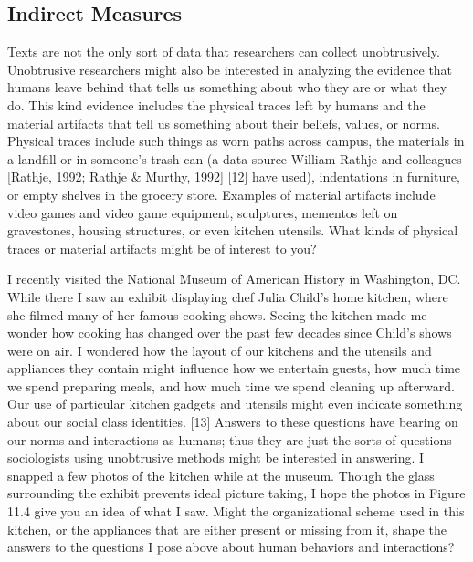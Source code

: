\subsection{Indirect Measures}

Texts are not the only sort of data that researchers can collect unobtrusively. Unobtrusive researchers might also be interested in analyzing the evidence that humans leave behind that tells us something about who they are or what they do. This kind evidence includes the physical traces left by humans and the material artifacts that tell us something about their beliefs, values, or norms. Physical traces include such things as worn paths across campus, the materials in a landfill or in someone’s trash can (a data source William Rathje and colleagues [Rathje, 1992; Rathje \& Murthy, 1992] [12] have used), indentations in furniture, or empty shelves in the grocery store. Examples of material artifacts include video games and video game equipment, sculptures, mementos left on gravestones, housing structures, or even kitchen utensils. What kinds of physical traces or material artifacts might be of interest to you?

I recently visited the National Museum of American History in Washington, DC. While there I saw an exhibit displaying chef Julia Child’s home kitchen, where she filmed many of her famous cooking shows. Seeing the kitchen made me wonder how cooking has changed over the past few decades since Child’s shows were on air. I wondered how the layout of our kitchens and the utensils and appliances they contain might influence how we entertain guests, how much time we spend preparing meals, and how much time we spend cleaning up afterward. Our use of particular kitchen gadgets and utensils might even indicate something about our social class identities. [13] Answers to these questions have bearing on our norms and interactions as humans; thus they are just the sorts of questions sociologists using unobtrusive methods might be interested in answering. I snapped a few photos of the kitchen while at the museum. Though the glass surrounding the exhibit prevents ideal picture taking, I hope the photos in Figure 11.4 give you an idea of what I saw. Might the organizational scheme used in this kitchen, or the appliances that are either present or missing from it, shape the answers to the questions I pose above about human behaviors and interactions?

